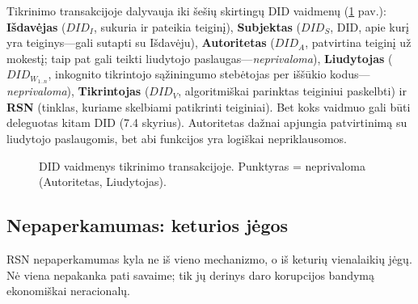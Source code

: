 \documentclass[11pt,a4paper,twocolumn]{article}
\begin{document}
Tikrinimo transakcijoje dalyvauja iki šešių skirtingų DID vaidmenų (\ref{fig:roles} pav.): \textbf{Išdavėjas} ($DID_I$, sukuria ir pateikia teiginį), \textbf{Subjektas} ($DID_S$, DID, apie kurį yra teiginys---gali sutapti su Išdavėju), \textbf{Autoritetas} ($DID_A$, patvirtina teiginį už mokestį; taip pat gali teikti liudytojo paslaugas---\emph{neprivaloma}), \textbf{Liudytojas} ($DID_{W_{1..n}}$, inkognito tikrintojo sąžiningumo stebėtojas per iššūkio kodus---\emph{neprivaloma}), \textbf{Tikrintojas} ($DID_V$, algoritmiškai parinktas teiginiui paskelbti) ir \textbf{RSN} (tinklas, kuriame skelbiami patikrinti teiginiai). Bet koks vaidmuo gali būti deleguotas kitam DID (7.4 skyrius). Autoritetas dažnai apjungia patvirtinimą su liudytojo paslaugomis, bet abi funkcijos yra logiškai nepriklausomos.

\begin{figure}[ht]
\centering
{}
\caption{DID vaidmenys tikrinimo transakcijoje. Punktyras = neprivaloma (Autoritetas, Liudytojas).}
\label{fig:roles}
\end{figure}

\subsection{Nepaperkamumas: keturios jėgos}

RSN nepaperkamumas kyla ne iš vieno mechanizmo, o iš keturių vienalaikių jėgų. Nė viena nepakanka pati savaime; tik jų derinys daro korupcijos bandymą ekonomiškai neracionalų.
\end{document}
